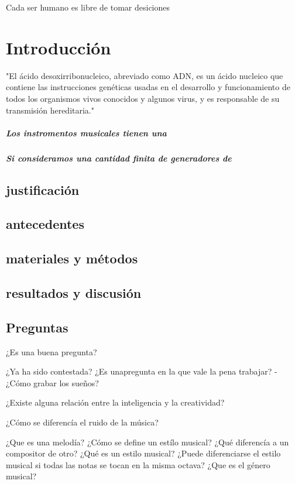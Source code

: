 Cada ser humano es libre de tomar desiciones

\chapter{Introducción}


"El ácido desoxirribonucleico, abreviado como ADN, es un ácido nucleico que contiene las instrucciones genéticas usadas en el desarrollo y funcionamiento de todos los organismos vivos conocidos y algunos virus, y es responsable de su transmisión hereditaria." \cite{wikipedia-adn-2016-01-11}

\paragraph{Los instromentos musicales tienen una}
\paragraph{Si consideramos una cantidad finita de generadores de }

\section{justificación}
\section{antecedentes}
\section{materiales y métodos}
\section{resultados y discusión}


\section{Preguntas}

¿Es una buena pregunta?

¿Ya ha sido contestada? 
¿Es unapregunta en la que vale la pena trabajar?
- ¿Cómo grabar los sueños?


¿Existe alguna relación entre la inteligencia  y la creatividad?

¿Cómo se diferencía el ruido de la música?

¿Que es una melodía?
¿Cómo se define un estílo musical?
¿Qué diferencía a un compositor de otro?
¿Qué es un estilo musical?
¿Puede diferenciarse el estilo musical si todas las notas se tocan en la misma octava?
¿Que es el género musical?

